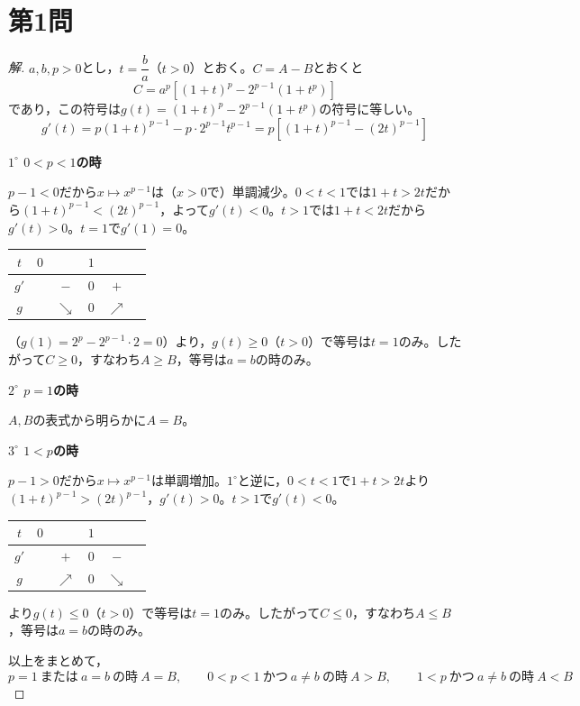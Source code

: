 \documentclass[../main.tex]{subfiles}
\begin{document}
\section*{第1問}

\begin{proof}[解]
  $a,b,p>0$とし，$t=\dfrac ba$（$t>0$）とおく。$C=A-B$とおくと
  \[
    C=a^p\left[(1+t)^p-2^{p-1}(1+t^p)\right]
  \]
  であり，この符号は$g(t)=(1+t)^p-2^{p-1}(1+t^p)$の符号に等しい。
  \[
    g'(t)=p(1+t)^{p-1}-p\cdot2^{p-1}t^{p-1}=p\left[(1+t)^{p-1}-(2t)^{p-1}\right]
  \]

  \textbf{$1^\circ$ $0<p<1$の時}

  $p-1<0$だから$x\mapsto x^{p-1}$は（$x>0$で）単調減少。$0<t<1$では$1+t>2t$だから$(1+t)^{p-1}<(2t)^{p-1}$，よって$g'(t)<0$。$t>1$では$1+t<2t$だから$g'(t)>0$。$t=1$で$g'(1)=0$。
  \begin{center}
    \begin{tabular}{c|ccccc}
      $t$ & $0$ & & $1$ & & \\
      \hline
      $g'$ & & $-$ & $0$ & $+$ & \\
      \hline
      $g$ & & $\searrow$ & $0$ & $\nearrow$ &
    \end{tabular}
  \end{center}
  （$g(1)=2^p-2^{p-1}\cdot2=0$）より，$g(t)\ge0$（$t>0$）で等号は$t=1$のみ。したがって$C\ge0$，すなわち$A\ge B$，等号は$a=b$の時のみ。

  \textbf{$2^\circ$ $p=1$の時}

  $A,B$の表式から明らかに$A=B$。

  \textbf{$3^\circ$ $1<p$の時}

  $p-1>0$だから$x\mapsto x^{p-1}$は単調増加。$1^\circ$と逆に，$0<t<1$で$1+t>2t$より$(1+t)^{p-1}>(2t)^{p-1}$，$g'(t)>0$。$t>1$で$g'(t)<0$。
  \begin{center}
    \begin{tabular}{c|ccccc}
      $t$ & $0$ & & $1$ & & \\
      \hline
      $g'$ & & $+$ & $0$ & $-$ & \\
      \hline
      $g$ & & $\nearrow$ & $0$ & $\searrow$ &
    \end{tabular}
  \end{center}
  より$g(t)\le0$（$t>0$）で等号は$t=1$のみ。したがって$C\le0$，すなわち$A\le B$，等号は$a=b$の時のみ。

  以上をまとめて，
  \[
    p=1\ \text{または}\ a=b\ \text{の時}\ A=B,\qquad
    0<p<1\ \text{かつ}\ a\ne b\ \text{の時}\ A>B,\qquad
    1<p\ \text{かつ}\ a\ne b\ \text{の時}\ A<B
  \]
\end{proof}
\end{document}

